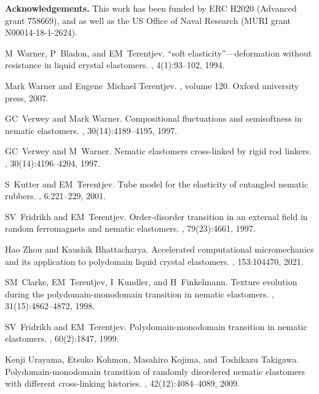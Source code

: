 \documentclass[12pt]{article}
\begin{document}
\vspace{0.2in}
\noindent \textbf{Acknowledgements.}
This work has been funded by ERC H2020 (Advanced grant 758669), and as well as the US Office of Naval Research (MURI grant N00014-18-1-2624).


\begin{thebibliography}{10}

M~Warner, P~Bladon, and EM~Terentjev.
\newblock “soft elasticity”—deformation without resistance in liquid
  crystal elastomers.
, 4(1):93--102, 1994.

Mark Warner and Eugene~Michael Terentjev.
, volume 120.
\newblock Oxford university press, 2007.

GC~Verwey and Mark Warner.
\newblock Compositional fluctuations and semisoftness in nematic elastomers.
, 30(14):4189--4195, 1997.

GC~Verwey and M~Warner.
\newblock Nematic elastomers cross-linked by rigid rod linkers.
, 30(14):4196--4204, 1997.

S~Kutter and EM~Terentjev.
\newblock Tube model for the elasticity of entangled nematic rubbers.
, 6:221--229, 2001.

SV~Fridrikh and EM~Terentjev.
\newblock Order-disorder transition in an external field in random ferromagnets
  and nematic elastomers.
, 79(23):4661, 1997.

Hao Zhou and Kaushik Bhattacharya.
\newblock Accelerated computational micromechanics and its application to
  polydomain liquid crystal elastomers.
, 153:104470,
  2021.

SM~Clarke, EM~Terentjev, I~Kundler, and H~Finkelmann.
\newblock Texture evolution during the polydomain-monodomain transition in
  nematic elastomers.
, 31(15):4862--4872, 1998.

SV~Fridrikh and EM~Terentjev.
\newblock Polydomain-monodomain transition in nematic elastomers.
, 60(2):1847, 1999.

Kenji Urayama, Etsuko Kohmon, Masahiro Kojima, and Toshikazu Takigawa.
\newblock Polydomain-monodomain transition of randomly disordered nematic
  elastomers with different cross-linking histories.
, 42(12):4084--4089, 2009.


\end{thebibliography}
\end{document}
